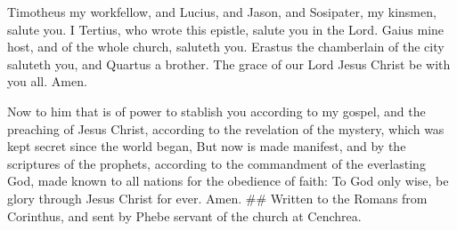  Timotheus my workfellow, and Lucius, and Jason, and
Sosipater, my kinsmen, salute you.  I Tertius, who wrote
this epistle, salute you in the Lord.  Gaius mine host,
and of the whole church, saluteth you. Erastus the chamberlain of the
city saluteth you, and Quartus a brother.  The grace of
our Lord Jesus Christ be with you all. Amen.

 Now to him that is of power to stablish you according to
my gospel, and the preaching of Jesus Christ, according to the
revelation of the mystery, which was kept secret since the world began,
 But now is made manifest, and by the scriptures of the
prophets, according to the commandment of the everlasting God, made
known to all nations for the obedience of faith:  To God
only wise, be glory through Jesus Christ for ever. Amen. \#\# Written to
the Romans from Corinthus, and sent by Phebe servant of the church at
Cenchrea.
